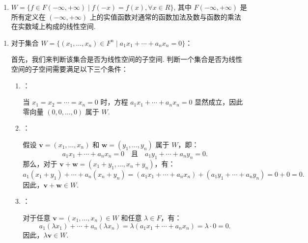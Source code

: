 \begin{exercise}
\begin{exgroup}
\begin{enumerate}
            \item $W = \{f \in F(-\infty, +\infty) \mid f(-x)=f(x), \forall x \in R\}$, 其中 $F(-\infty, +\infty)$ 是所有定义在 $(-\infty, +\infty)$ 上的实值函数对通常的函数加法及数与函数的乘法在实数域上构成的线性空间.
        \end{enumerate}

        \begin{answer}
            \begin{enumerate}
                \item 对于集合 \( W = \{(x_1, \ldots, x_n) \in F^n \mid a_1x_1 + \cdots + a_nx_n = 0\} \)：

                首先，我们来判断该集合是否为线性空间的子空间. 判断一个集合是否为线性空间的子空间需要满足以下三个条件：

                \begin{enumerate}
                    \item {}：

                    当 \( x_1 = x_2 = \cdots = x_n = 0 \) 时，方程 \( a_1x_1 + \cdots + a_nx_n = 0 \) 显然成立，因此零向量 \( (0, 0, \ldots, 0) \) 属于 \( W \).

                    \item {}：

                    假设 \( \mathbf{v} = (x_1, \ldots, x_n) \) 和 \( \mathbf{w} = (y_1, \ldots, y_n) \) 属于 \( W \)，即：
                    \[
                    a_1x_1 + \cdots + a_nx_n = 0 \quad \text{且} \quad a_1y_1 + \cdots + a_ny_n = 0.
                    \]
                    那么，对于 \( \mathbf{v} + \mathbf{w} = (x_1 + y_1, \ldots, x_n + y_n) \)，有：
                    \[
                    a_1(x_1 + y_1) + \cdots + a_n(x_n + y_n) = (a_1x_1 + \cdots + a_nx_n) + (a_1y_1 + \cdots + a_ny_n) = 0 + 0 = 0.
                    \]
                    因此，\( \mathbf{v} + \mathbf{w} \in W \).

                    \item {}：

                    对于任意 \( \mathbf{v} = (x_1, \ldots, x_n) \in W \) 和任意 \( \lambda \in F \)，有：
                    \[
                    a_1(\lambda x_1) + \cdots + a_n(\lambda x_n) = \lambda (a_1x_1 + \cdots + a_nx_n) = \lambda \cdot 0 = 0.
                    \]
                    因此，\( \lambda \mathbf{v} \in W \).
                \end{enumerate}


\end{enumerate}
\end{answer}
\end{exgroup}
\end{exercise}
